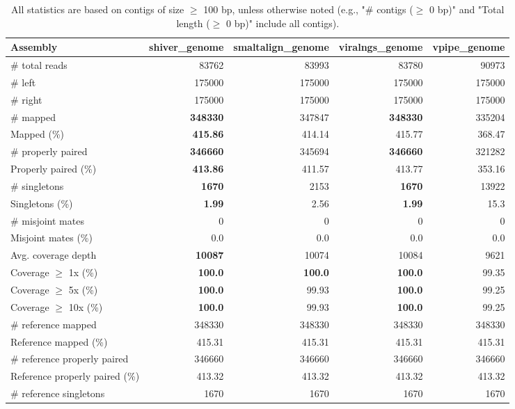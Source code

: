 \documentclass[12pt,a4paper]{article}
\begin{document}
\begin{table}[ht]
\begin{center}
\caption{All statistics are based on contigs of size $\geq$ 100 bp, unless otherwise noted (e.g., "\# contigs ($\geq$ 0 bp)" and "Total length ($\geq$ 0 bp)" include all contigs).}
\begin{tabular}{|l*{4}{|r}|}
\hline
Assembly & shiver\_genome & smaltalign\_genome & viralngs\_genome & vpipe\_genome \\ \hline
\# total reads & 83762 & 83993 & 83780 & 90973 \\ \hline
\# left & 175000 & 175000 & 175000 & 175000 \\ \hline
\# right & 175000 & 175000 & 175000 & 175000 \\ \hline
\# mapped & {\bf 348330} & 347847 & {\bf 348330} & 335204 \\ \hline
Mapped (\%) & {\bf 415.86} & 414.14 & 415.77 & 368.47 \\ \hline
\# properly paired & {\bf 346660} & 345694 & {\bf 346660} & 321282 \\ \hline
Properly paired (\%) & {\bf 413.86} & 411.57 & 413.77 & 353.16 \\ \hline
\# singletons & {\bf 1670} & 2153 & {\bf 1670} & 13922 \\ \hline
Singletons (\%) & {\bf 1.99} & 2.56 & {\bf 1.99} & 15.3 \\ \hline
\# misjoint mates & 0 & 0 & 0 & 0 \\ \hline
Misjoint mates (\%) & 0.0 & 0.0 & 0.0 & 0.0 \\ \hline
Avg. coverage depth & {\bf 10087} & 10074 & 10084 & 9621 \\ \hline
Coverage $\geq$ 1x (\%) & {\bf 100.0} & {\bf 100.0} & {\bf 100.0} & 99.35 \\ \hline
Coverage $\geq$ 5x (\%) & {\bf 100.0} & 99.93 & {\bf 100.0} & 99.25 \\ \hline
Coverage $\geq$ 10x (\%) & {\bf 100.0} & 99.93 & {\bf 100.0} & 99.25 \\ \hline
\# reference mapped & 348330 & 348330 & 348330 & 348330 \\ \hline
Reference mapped (\%) & 415.31 & 415.31 & 415.31 & 415.31 \\ \hline
\# reference properly paired & 346660 & 346660 & 346660 & 346660 \\ \hline
Reference properly paired (\%) & 413.32 & 413.32 & 413.32 & 413.32 \\ \hline
\# reference singletons & 1670 & 1670 & 1670 & 1670 \\ \hline

\end{tabular}
\end{center}
\end{table}
\end{document}
